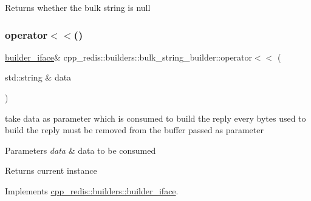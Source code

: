 \begin{DoxyReturn}{Returns}
whether the bulk string is null 
\end{DoxyReturn}
\mbox{\label{classcpp__redis_1_1builders_1_1bulk__string__builder_a43000357f87212f657aafe279a92b541}} 
\subsubsection{\texorpdfstring{operator$<$$<$()}{operator<<()}}
{\footnotesize\ttfamily \mbox{\hyperlink{classcpp__redis_1_1builders_1_1builder__iface}{builder\+\_\+iface}}\& cpp\+\_\+redis\+::builders\+::bulk\+\_\+string\+\_\+builder\+::operator$<$$<$ (\begin{DoxyParamCaption}\item[{std\+::string \&}]{data }\end{DoxyParamCaption})\hspace{0.3cm}{\ttfamily [virtual]}}

take data as parameter which is consumed to build the reply every bytes used to build the reply must be removed from the buffer passed as parameter


\begin{DoxyParams}{Parameters}
{\em data} & data to be consumed \\
\hline
\end{DoxyParams}
\begin{DoxyReturn}{Returns}
current instance 
\end{DoxyReturn}


Implements \mbox{\hyperlink{classcpp__redis_1_1builders_1_1builder__iface_a9892bbc9c887c31c2742dad4476e2fa6}{cpp\+\_\+redis\+::builders\+::builder\+\_\+iface}}.

\mbox{\label{classcpp__redis_1_1builders_1_1bulk__string__builder_a4d80d8dfe305e35aca8b4ec84c56fbea}} 
